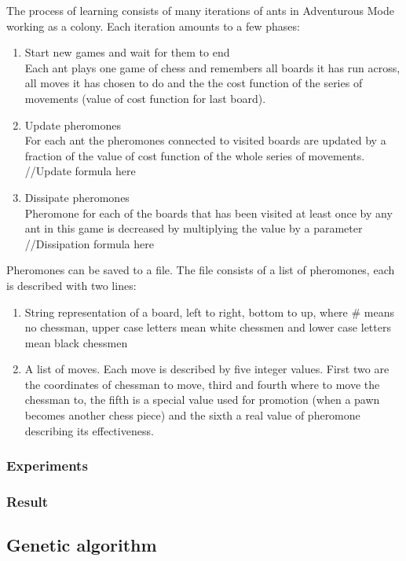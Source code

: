 \documentclass[pdftex]{article}
\begin{document}
The process of learning consists of many iterations of ants in Adventurous Mode working as a colony. Each iteration amounts to a few phases:
\begin{enumerate}
 	\item Start new games and wait for them to end \hfill \\
		Each ant plays one game of chess and remembers all boards it has run across, all moves it has chosen to do and the
the cost function of the series of movements (value of cost function for last board).
	\item Update pheromones \hfill \\
		For each ant the pheromones connected to visited boards are updated by a fraction of the value of cost function of the whole series of movements.
		//Update formula here
	\item Dissipate pheromones \hfill \\
		Pheromone for each of the boards that has been visited at least once by any ant in this game is decreased by multiplying the value by a parameter
		//Dissipation formula here 
\end{enumerate}

Pheromones can be saved to a file. The file consists of a list of pheromones, each is described with two lines:
\begin{enumerate}
 	\item String representation of a board, left to right, bottom to up, where \# means no chessman, upper case letters mean white chessmen and lower case letters mean black chessmen \hfill \\
	\item A list of moves. Each move is described by five integer values. First two are the coordinates of chessman to move, third and fourth where to move the chessman to, the fifth is a special value used for promotion (when a pawn becomes another chess piece) and the sixth a real value of pheromone describing its effectiveness. \hfill \\
\end{enumerate}


\subsubsection{Experiments}
\subsubsection{Result}

\subsection{Genetic algorithm}
\label{sec:genetic}
\end{document}
